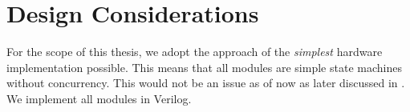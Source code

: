 
\section{Design Considerations}

For the scope of this thesis, we adopt the approach of the \emph{simplest} hardware implementation possible.  This means that all modules are simple state machines without concurrency. This would not be an issue as of now as later discussed in . We implement all modules in Verilog.